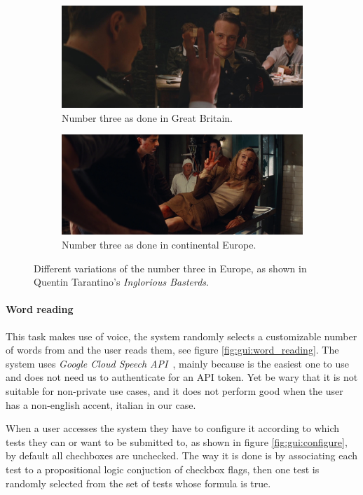 \begin{figure}[h!t]
    \centering
    \begin{subfigure}{\textwidth}
        \centering
        \includegraphics[scale=0.15]{assets/images/inglorious_basterds_english.jpg}
        \caption{Number three as done in Great Britain.}
        \label{fig:inglorious:english}
    \end{subfigure}
    \begin{subfigure}{\textwidth}
        \centering
        \includegraphics[scale=0.15]{assets/images/inglorious_basterds_german.png}
        \caption{Number three as done in continental Europe.}
        \label{fig:inglorious:german}
    \end{subfigure}
    \caption{Different variations of the number three in Europe, as shown in Quentin Tarantino's \emph{Inglorious Basterds}.}
    \label{fig:inglorious}
\end{figure}


\paragraph{Word reading}
This task makes use of voice, the system randomly selects a customizable number of words from \cite{dwyl2022engwords} and the user reads them, see figure \ref{fig:gui:word_reading}.
The system uses \emph{Google Cloud Speech API}~\cite{google2022speech}, mainly because is the easiest one to use and does not need us to authenticate for an API token.
Yet be wary that it is not suitable for non-private use cases, and it does not perform good when the user has a non-english accent, italian in our case.

When a user accesses the system they have to configure it according to which tests they can or want to be submitted to, as shown in figure \ref{fig:gui:configure}, by default all chechboxes are unchecked.
The way it is done is by associating each test to a propositional logic conjuction of checkbox flags, then one test is randomly selected from the set of tests whose formula is true.
